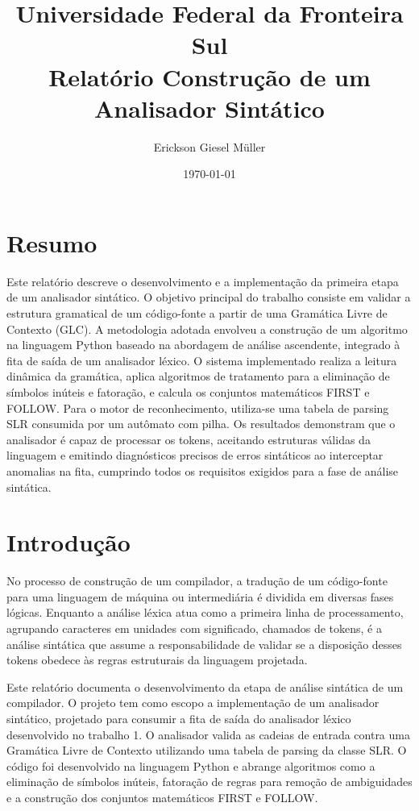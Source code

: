 \documentclass[12pt, a4paper]{article}
\title{Universidade Federal da Fronteira Sul\\
Relatório Construção de um Analisador Sintático}
\author{Erickson Giesel Müller}
\date{\today}
\begin{document}
\maketitle
\thispagestyle{empty} %

\section{Resumo}
	Este relatório descreve o desenvolvimento e a implementação da primeira etapa de um analisador sintático. O objetivo principal do trabalho consiste em validar a estrutura gramatical de um código-fonte a partir de uma Gramática Livre de Contexto (GLC). A metodologia adotada envolveu a construção de um algoritmo na linguagem Python baseado na abordagem de análise ascendente, integrado à fita de saída de um analisador léxico. O sistema implementado realiza a leitura dinâmica da gramática, aplica algoritmos de tratamento para a eliminação de símbolos inúteis e fatoração, e calcula os conjuntos matemáticos FIRST e FOLLOW. Para o motor de reconhecimento, utiliza-se uma tabela de parsing SLR consumida por um autômato com pilha. Os resultados demonstram que o analisador é capaz de processar os tokens, aceitando estruturas válidas da linguagem e emitindo diagnósticos precisos de erros sintáticos ao interceptar anomalias na fita, cumprindo todos os requisitos exigidos para a fase de análise sintática.

\section{Introdução}
	No processo de construção de um compilador, a tradução de um código-fonte para uma linguagem de máquina ou intermediária é dividida em diversas fases lógicas. Enquanto a análise léxica atua como a primeira linha de processamento, agrupando caracteres em unidades com significado, chamados de tokens, é a análise sintática que assume a responsabilidade de validar se a disposição desses tokens obedece às regras estruturais da linguagem projetada.

	Este relatório documenta o desenvolvimento da etapa de análise sintática de um compilador. O projeto tem como escopo a implementação de um analisador sintático, projetado para consumir a fita de saída do analisador léxico desenvolvido no trabalho 1. O analisador valida as cadeias de entrada contra uma Gramática Livre de Contexto utilizando uma tabela de parsing da classe SLR. O código foi desenvolvido na linguagem Python e abrange algoritmos como a eliminação de símbolos inúteis, fatoração de regras para remoção de ambiguidades e a construção dos conjuntos matemáticos FIRST e FOLLOW.
\end{document}
